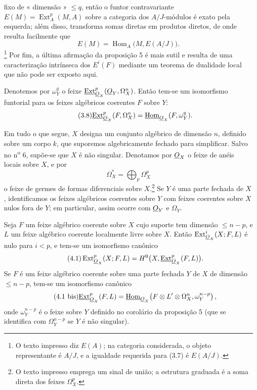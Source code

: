 fixo de « dimensão » $\leq q$, então o funtor contravariante
$E(M)=\operatorname{Ext}_{A}^{p}(M,A)$ sobre a categoria dos $A/J$-módulos é
exato pela esquerda; além disso, transforma somas diretas em produtos diretos,
de onde resulta facilmente que
\[
  E(M)=\operatorname{Hom}_{A}\bigl(M,E(A/J)\bigr).
\]
\footnote{O texto impresso diz $E(A)$; na categoria considerada, o objeto
representante é $A/J$, e a igualdade requerida para (3.7) é $E(A/J)$.} Por fim, a
última afirmação da proposição 5 é mais sutil e resulta de uma
caracterização intrínseca dos $E^{i}(F)$ mediante um teorema de dualidade
local que não pode ser exposto aqui.

 Denotemos por $\omega_Y^{q}$ o feixe
$\underline{\operatorname{Ext}}_{\underline{O}_X}^{p}(\underline{O}_Y,\Omega_X^{n})$. Então tem-se um isomorfismo
funtorial para os feixes algébricos coerentes $F$ sobre $Y$:
\begin{equation}\tag{3.8}
  \underline{\operatorname{Ext}}_{\underline{O}_X}^{p}(F,\Omega_X^{n})
  =\underline{\operatorname{Hom}}_{\underline{O}_X}(F,\omega_Y^{q}).
\end{equation}


Em tudo o que segue, $X$ designa um conjunto algébrico de dimensão $n$, definido
sobre um corpo $k$, que suporemos algebricamente fechado para simplificar. Salvo
no n\textsuperscript{o} 6, supõe-se que $X$ é não singular. Denotamos por
$\underline{O}_X$ o feixe de anéis locais sobre $X$, e por
\[
  \Omega_X^{*}=\bigoplus_p\Omega_X^{p}
\]
o feixe de germes de formas diferenciais sobre $X$.\footnote{O texto
impresso emprega um sinal de união; a estrutura graduada é a soma direta
dos feixes $\Omega_X^p$.} Se $Y$ é uma parte fechada de $X$, identificamos
os feixes algébricos coerentes sobre $Y$ com feixes coerentes sobre $X$
nulos fora de $Y$; em particular, assim ocorre com $\underline{O}_Y$ e $\Omega_Y$.

 Seja $F$ um feixe algébrico coerente sobre $X$ cujo
suporte tem dimensão $\leq n-p$, e $L$ um feixe algébrico coerente
localmente livre sobre $X$. Então $\operatorname{Ext}_{\underline{O}_X}^{i}(X;F,L)$ é nulo
para $i<p$, e tem-se um isomorfismo canônico
\begin{equation}\tag{4.1}
  \operatorname{Ext}_{\underline{O}_X}^{p}(X;F,L)
  =H^{0}\bigl(X,\underline{\operatorname{Ext}}_{\underline{O}_X}^{p}(F,L)\bigr).
\end{equation}
Se $F$ é um feixe algébrico coerente sobre uma parte fechada $Y$ de $X$ de
dimensão $\leq n-p$, tem-se um isomorfismo canônico
\begin{equation}\tag{4.1 bis}
  \underline{\operatorname{Ext}}_{\underline{O}_X}^{p}(F,L)
  =\underline{\operatorname{Hom}}_{\underline{O}_X}\!\left(
    F\otimes L'\otimes\Omega_X^{n},\omega_Y^{n-p}
  \right),
\end{equation}
onde $\omega_Y^{n-p}$ é o feixe sobre $Y$ definido no corolário da
proposição 5 (que se identifica com $\Omega_Y^{n-p}$ se $Y$ é não singular).

